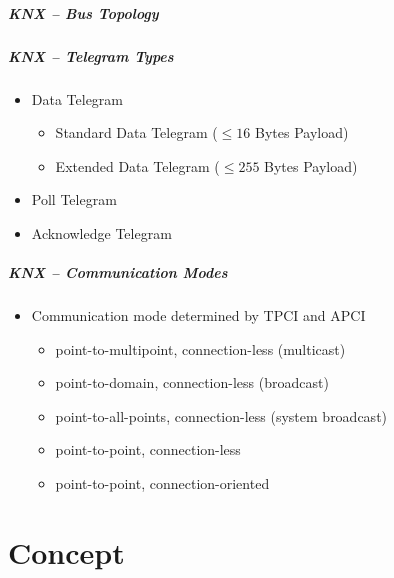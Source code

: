 \begin{frame}[c]
	\frametitle{KNX -- Bus Topology}
	
	\nocite{Sokollik2017}
	
\end{frame}

\begin{frame}[c]
	\frametitle{KNX -- Telegram Types}
	\begin{itemize}
		\item Data Telegram
			\begin{itemize}
				\item Standard Data Telegram ($\leq 16$ Bytes Payload)
				\item Extended Data Telegram ($\leq 255$ Bytes Payload)
			\end{itemize}
		\item Poll Telegram
		\item Acknowledge Telegram
	\end{itemize}
	
	\note{
		
	}
\end{frame}

\begin{frame}[c]
	\frametitle{KNX -- Communication Modes}
	\begin{itemize}
		\item Communication mode determined by TPCI and APCI
			\begin{itemize}
				\item point-to-multipoint, connection-less (multicast)
				\item point-to-domain, connection-less (broadcast)
				\item point-to-all-points, connection-less (system broadcast)
				\item point-to-point, connection-less
				\item point-to-point, connection-oriented
			\end{itemize}
			
	\end{itemize}
	
\end{frame}


\part{Concept}
\label{part:concept}

